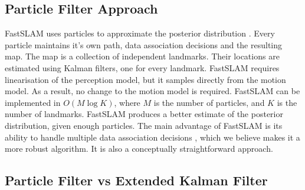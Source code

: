 \subsection{Particle Filter Approach}
FastSLAM uses particles to approximate the posterior distribution
\cite{fastslam}. Every particle maintains it's own path,
data association decisions and the resulting map. The map is a
collection of independent landmarks. Their locations are estimated
using Kalman filters, one for every landmark. FastSLAM requires
linearisation of the perception model, but it samples directly from
the motion model. As a result, no change to the motion model is
required. FastSLAM can be implemented in $O(M\log K)$, where $M$ is
the number of particles, and $K$ is the number of landmarks. FastSLAM
produces a better estimate of the posterior distribution, given enough
particles. The main advantage of FastSLAM is its ability to handle
multiple data association decisions \cite{Montemerlo2003}, which we
believe makes it a more robust algorithm. It is also a conceptually
straightforward approach.


\subsection{Particle Filter vs Extended Kalman Filter}
\label{sec:PFvsEKF}

